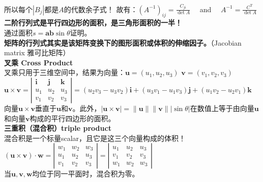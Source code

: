     \\
    所以每个$|B_{j}|$都是$A$的代数余子式！ 故有：$\left(A^{-1}\right)_{i j}=\frac{C_{j i}}{\operatorname{det} A} \quad$ and $\quad A^{-1}=\frac{C^{\mathrm{T}}}{\operatorname{det} A}$
    \\
    \textbf{二阶行列式是平行四边形的面积，是三角形面积的一半！} \\
    通过面积$s=\bm{ab}\sin \theta$证明。
    \\
    \textbf{矩阵的行列式其实是该矩阵变换下的图形面积或体积的伸缩因子。}（Jacobian matrix 雅可比矩阵） \\
    \textbf{叉乘 Cross Product}\\
    叉乘只用于三维空间中，结果为向量：$\bm{u}=\left(u_{1}, u_{2}, u_{3}\right)$ $\bm{v}=\left(v_{1}, v_{2}, v_{3}\right)$
    \\
    $\bm{u} \times \bm{v}=\left|\begin{array}{ccc}\bm{i} & \bm{j} & \bm{k} \\ {u_{1}} & {u_{2}} & {u_{3}} \\ {v_{1}} & {v_{2}} & {v_{3}}\end{array}\right|=\left(u_{2} v_{3}-u_{3} v_{2}\right) \bm{i}+\left(u_{3} v_{1}-u_{1} v_{3}\right) \bm{j}+\left(u_{1} v_{2}-u_{2} v_{1}\right) \bm{k}$
    \\
    向量$\bm{u} \times \bm{v}$垂直于$\bm{u}$和$\bm{v}$。此外，$|\bm{u} \times \bm{v}|=\|\boldsymbol{u}\|\|\boldsymbol{v}\||\sin \theta|$在数值上等于由向量$\bm{u}$和向量$\bm{v}$构成的平行四边形的面积。
    \\
    \textbf{三重积（混合积）triple product} \\
    混合积是一个标量scalar，且它是这三个向量构成的体积！\\
    $(\boldsymbol{u} \times \boldsymbol{v}) \cdot \boldsymbol{w}=\left|\begin{array}{lll}{w_{1}} & {w_{2}} & {w_{3}} \\ {u_{1}} & {u_{2}} & {u_{3}} \\ {v_{1}} & {v_{2}} & {v_{3}}\end{array}\right|=\left|\begin{array}{ccc}{u_{1}} & {u_{2}} & {u_{3}} \\ {v_{1}} & {v_{2}} & {v_{3}} \\ {w_{1}} & {w_{2}} & {w_{3}}\end{array}\right|$
    \\
    当$\bm{u,v,w}$均位于同一平面时，混合积为零。